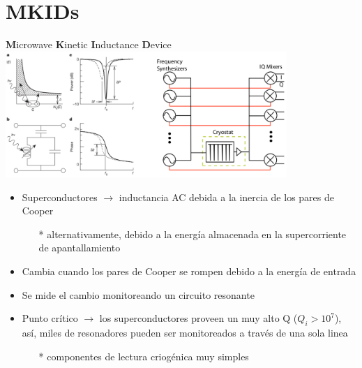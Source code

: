 \documentclass[ignorenonframetext,12pt]{beamer}
\begin{document}
\section{MKIDs}
\begin{frame}{\textbf{M}icrowave \textbf{K}inetic \textbf{I}nductance \textbf{D}evice}
				\centering
												\includegraphics[width=0.8\textwidth]{concepto_mkid1}
				\begin{itemize}
								\item \footnotesize{Superconductores $\to$ inductancia AC debida a la
												inercia de los pares de Cooper}
												\begin{itemize}
																\item[*] \scriptsize{{\color{blue}alternativamente, debido a la
																				energía almacenada en la supercorriente
																				de apantallamiento}}
												\end{itemize}
								\item Cambia cuando los pares de Cooper se rompen debido a la
												energía de entrada
								\item Se mide el cambio monitoreando un circuito resonante
								\item Punto crítico $\to$ los superconductores proveen un muy
												alto Q ($Q_i > 10^7$), así, miles de resonadores
												pueden ser monitoreados a través de una sola linea 
												\begin{itemize}
																\item[*] \scriptsize{{\color{blue}componentes de lectura criogénica muy
																				simples}}
												\end{itemize}
				\end{itemize}

\end{frame}
\end{document}
